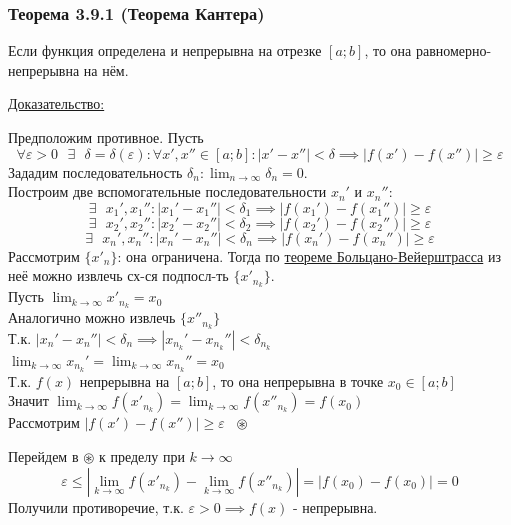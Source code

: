 \documentclass[12pt]{article}
\def\posl#1#2{\{#1_{#2}\}}
\begin{document}
    \subsubsection*{Теорема 3.9.1 (Теорема Кантера)}\label{th:3.9.1}
    Если функция определена и непрерывна на отрезке $[a; b]$, то она равномерно-непрерывна на нём.\par\noindent
    \underline{Доказательство:}
    \begin{adjustwidth}{1.5em}{1.5em}
        Предположим противное. Пусть \[\forall \varepsilon > 0 \text{ } \exists \text{ } \delta = \delta(\varepsilon) : \forall x', x'' \in [a;b] :  |x' - x''| < \delta \implies |f(x') - f(x'')| \ge \varepsilon \]
        Зададим последовательность $\delta_n : \lim_{n\to\infty} \delta_n = 0$.\\
        Построим две вспомогательные последовательности $x_n'$ и $x_n''$:
        \[ \exists \text{ } x_1', x_1'' : |x_1' - x_1''| < \delta_1 \implies |f(x_1') - f(x_1'')| \ge \varepsilon \]
        \[ \exists \text{ } x_2', x_2'' : |x_2' - x_2''| < \delta_2 \implies |f(x_2') - f(x_2'')| \ge \varepsilon \]
        \[ \exists \text{ } x_n', x_n'' : |x_n' - x_n''| < \delta_n \implies |f(x_n') - f(x_n'')| \ge \varepsilon \]
        Рассмотрим $\posl{x'}{n}$: она ограничена. Тогда по \hyperref[th:2.8.1]{теореме Больцано-Вейерштрасса} из неё можно извлечь сх-ся подпосл-ть $\posl{x'}{n_k}$.\\
        Пусть $\lim_{k\to\infty} x'_{n_k} = x_0$\\
        Аналогично можно извлечь $\posl{x''}{n_k}$\\
        Т.к. $|x_n' - x_n''| < \delta_n \implies |x_{n_k}' - x_{n_k}''| < \delta_{n_k}$\\
        $\lim_{k\to\infty}x_{n_k}' = \lim_{k\to\infty}x_{n_k}'' = x_0$\\
        Т.к. $f(x)$ непрерывна на $[a; b]$, то она непрерывна в точке $x_0 \in [a;b]$\\
        Значит $\lim_{k\to\infty}f(x'_{n_k}) = \lim_{k\to\infty}f(x''_{n_k}) = f(x_0)$\\
        Рассмотрим $|f(x') - f(x'')| \ge \varepsilon \,\,\,\, \circledast$
        \begin{adjustwidth}{1.5em}{1.5em}
            Перейдем в $\circledast$ к пределу при $k \to \infty$
            \[ \varepsilon \le | \lim_{k\to\infty}f(x'_{n_k}) - \lim_{k\to\infty}f(x''_{n_k})| = |f(x_0) - f(x_0)| = 0 \]
            Получили противоречие, т.к. $\varepsilon > 0 \implies f(x)$ - непрерывна.
        \end{adjustwidth}
    \end{adjustwidth}
\end{document}
